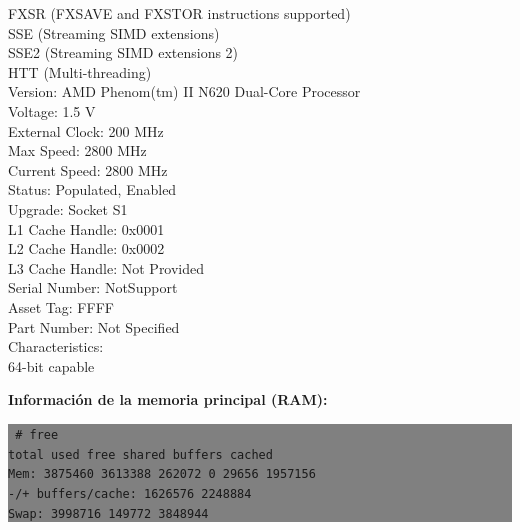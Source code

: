 \documentclass[12pt]{article}
\begin{document}
{{{{		FXSR (FXSAVE and FXSTOR instructions supported)\\
		SSE (Streaming SIMD extensions)\\
		SSE2 (Streaming SIMD extensions 2)\\
		HTT (Multi-threading)\\
	Version: AMD Phenom(tm) II N620 Dual-Core Processor\\
	Voltage: 1.5 V\\
	External Clock: 200 MHz\\
	Max Speed: 2800 MHz\\
	Current Speed: 2800 MHz\\
	Status: Populated, Enabled\\
	Upgrade: Socket S1\\
	L1 Cache Handle: 0x0001\\
	L2 Cache Handle: 0x0002\\
	L3 Cache Handle: Not Provided\\
	Serial Number: NotSupport\\
	Asset Tag: FFFF\\
	Part Number: Not Specified\\
	Characteristics:\\
		64-bit capable
}
} \vspace*{0.5cm} } } 

\textbf{Información de la memoria principal (RAM):}

\colorbox{grey}{\parbox[t]{0.95\linewidth}{ \vspace*{0.5cm} { 
{\tt
\# free\\
             total       used       free     shared    buffers     cached\\
Mem:       3875460    3613388     262072          0      29656    1957156\\
-/+ buffers/cache:    1626576    2248884\\
Swap:      3998716     149772    3848944\\
}
} \vspace*{0.5cm} } } 
\end{document}
